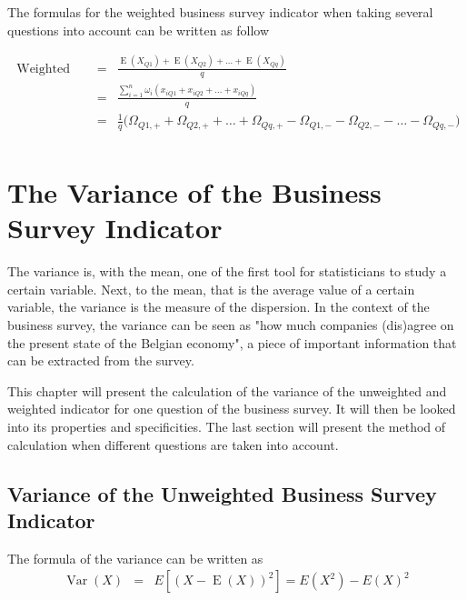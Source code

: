 \documentclass[12pt,a4paper,oneside]{book}
\DeclareMathOperator{\Var}{Var}
\DeclareMathOperator{\E}{E}
\begin{document}
The formulas for the weighted business survey indicator when taking several questions into account can be written as follow

\begin{eqnarray}
    \mbox{ Weighted BSI} &=& \frac{\E(X_{Q1}) + \E(X_{Q2}) + \ldots + \E(X_{Qq})}{q} \\
    &=& \frac{\sum^n_{i=1} \omega_i \left( x_{iQ1} + x_{iQ2} +\ldots + x_{iQq} \right)}{q} \\    
    &=& \frac{1}{q} \big( \Omega_{Q1,+} + \Omega_{Q2,+} + \ldots + \Omega_{Qq,+} - \Omega_{Q1,-} - \Omega_{Q2,-} - \ldots - \Omega_{Qq,-} \big) \nonumber\\
\end{eqnarray}





\chapter{The Variance of the Business Survey Indicator}

The variance is, with the mean, one of the first tool for statisticians to study a certain variable. 
Next, to the mean, that is the average value of a certain variable, the variance is the measure of the dispersion. 
In the context of the business survey, the variance can be seen as "how much companies (dis)agree on the present state of the Belgian economy", a piece of important information that can be extracted from the survey.


This chapter will present the calculation of the variance of the unweighted and weighted indicator for one question of the business survey. It will then be looked into its properties and specificities.
The last section will present the method of calculation when different questions are taken into account.

\section{Variance of the Unweighted Business Survey Indicator}

\nocite{alcaniz_calculation_2006}

The formula of the variance can be written as 
\begin{eqnarray}
         \Var(X) &=& E \left[ \left(X-\E(X) \right)^2 \right] =  E\left( X^2\right) - E\left( X\right)^2 \\ \nonumber
\end{eqnarray}
\end{document}
